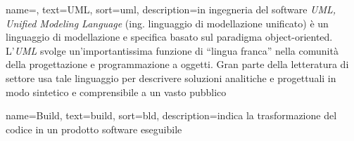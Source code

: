






 {
    name=,
    text=UML,
    sort=uml,
    description={in ingegneria del software \emph{UML, Unified Modeling Language} (ing. linguaggio di modellazione unificato) è un linguaggio di modellazione e specifica basato sul paradigma object-oriented. L'\emph{UML} svolge un'importantissima funzione di ``lingua franca'' nella comunità della progettazione e programmazione a oggetti. Gran parte della letteratura di settore usa tale linguaggio per descrivere soluzioni analitiche e progettuali in modo sintetico e comprensibile a un vasto pubblico}
}


 {
    name=Build,
    text=build,
    sort=bld,
    description={indica la trasformazione del codice in un prodotto software eseguibile}
}

